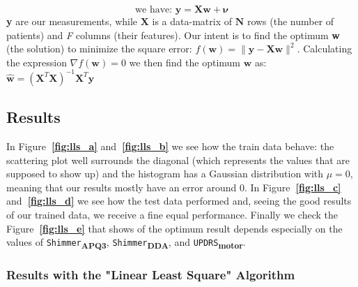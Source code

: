 \documentclass[12pt]{report}
\begin{document}
\begin{equation}
\text{we have: }
\mathbf { y } = \mathbf { X } \mathbf { w } + \boldsymbol { \nu }
\end{equation}
\textbf{y} are our measurements, while $\textbf{X}$ is a data-matrix of $\textbf{N}$ rows (the number of patients) and \textit{F} columns (their features). Our intent is to find the optimum \textbf{w} (the solution) to minimize the square error: $f ( \mathbf { w } ) = \| \mathbf { y } - \mathbf { X w } \| ^ { 2 }$.
Calculating the expression $\nabla f ( \mathbf { w } ) =0 $ we then find the optimum ${ \mathbf { w } }$ as: $\hat { \mathbf { w } } = \left( \mathbf { X } ^ { T } \mathbf { X } \right) ^ { - 1 } \mathbf { X } ^ { T } \mathbf { y }$
\subsection{Results}
In Figure\textbf{\subfigurename~\ref{fig:lls_a}} and\textbf{\subfigurename~\ref{fig:lls_b} }we see how the train data behave: the scattering plot well surrounds the diagonal (which represents the values that are supposed to show up) and the histogram has a Gaussian distribution with $\mu = 0$, meaning that our results mostly have an error around $0$. In Figure\textbf{\subfigurename~\ref{fig:lls_c}} and\textbf{\subfigurename~\ref{fig:lls_d}} we see how the test data performed and, seeing the good results of our trained data, we receive a fine equal performance.
Finally we check the Figure\textbf{\subfigurename~\ref{fig:lls_e}} that shows of the optimum result depends especially on the values of \texttt{Shimmer}\textsubscript{\textbf{APQ3}}, \texttt{Shimmer}\textsubscript{\textbf{DDA}}, and \texttt{UPDRS}\textsubscript{\textbf{motor}}.
\pagebreak

\begin{center}
\subsubsection{Results with the "Linear Least Square" Algorithm}
\end{center}
\end{document}
